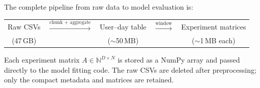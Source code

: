 The complete pipeline from raw data to model evaluation is:
\begin{center}
\begin{tabular}{ccccc}
Raw CSVs & $\xrightarrow{\text{chunk + aggregate}}$ &
User--day table & $\xrightarrow{\text{window}}$ &
Experiment matrices \\
(47\,GB) & & ($\sim$50\,MB) & & ($\sim$1\,MB each)
\end{tabular}
\end{center}
\noindent
Each experiment matrix $A \in \mathbb{N}^{D \times N}$ is stored
as a NumPy array and passed directly to the model fitting code.
The raw CSVs are deleted after preprocessing; only the compact
metadata and matrices are retained.
